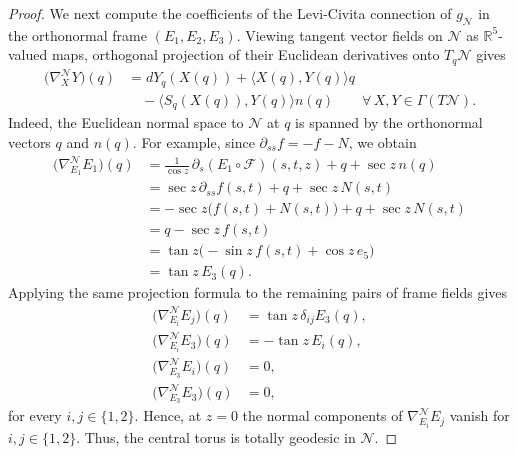 \documentclass[a4paper,11pt,oneside,reqno]{amsart}
\numberwithin{equation}{section}
\theoremstyle{definition}
\begin{document}
\begin{proof}
    We next compute the coefficients of the Levi-Civita connection of
    $g_{\mathcal{N}}$ in the orthonormal frame $(E_1,E_2,E_3)$.
    Viewing tangent vector fields on $\mathcal{N}$
    as $\mathbb{R}^5$-valued maps, orthogonal projection
    of their Euclidean derivatives onto $T_q\mathcal{N}$
    gives
    \begin{align*}
        \bigl(\nabla^{\mathcal{N}}_X Y\bigr)(q)
        &=dY_q(X(q))+\langle X(q),Y(q)\rangle q\\
        &\quad-\langle S_q(X(q)),Y(q)\rangle n(q)
        \qquad\forall\,X,Y\in\Gamma(T\mathcal{N}).
    \end{align*}
    Indeed, the Euclidean normal space to $\mathcal{N}$
    at $q$ is spanned by the orthonormal vectors
    $q$ and $n(q)$.
    For example, since
    $\partial_{ss}f=-f-N$, we obtain
    \begin{align*}
        \bigl(\nabla^{\mathcal{N}}_{E_1}E_1\bigr)(q)
        &=
        \frac{1}{\cos z}\,
        \partial_s(E_1\circ\mathcal{F})(s,t,z)
        +q+\sec z\,n(q)\\
        &=
        \sec z\,\partial_{ss}f(s,t)
        +q+\sec z\,N(s,t)\\
        &=
        -\sec z\bigl(f(s,t)+N(s,t)\bigr)
        +q+\sec z\,N(s,t)\\
        &=q-\sec z\,f(s,t)\\
        &=
        \tan z\bigl(-\sin z\,f(s,t)+\cos z\,e_5\bigr)\\
        &=\tan z\,E_3(q).
    \end{align*}
    Applying the same projection formula to the
    remaining pairs of frame fields gives
    \begin{align*}
        \bigl(\nabla^{\mathcal{N}}_{E_i}E_j\bigr)(q)
        &=\tan z\,\delta_{ij}E_3(q),\\
        \bigl(\nabla^{\mathcal{N}}_{E_i}E_3\bigr)(q)
        &=-\tan z\,E_i(q),\\
        \bigl(\nabla^{\mathcal{N}}_{E_3}E_i\bigr)(q)
        &=0,\\
        \bigl(\nabla^{\mathcal{N}}_{E_3}E_3\bigr)(q)
        &=0,
    \end{align*}
    for every $i,j\in\{1,2\}$. Hence, at $z=0$ the normal components of $\nabla^{\mathcal{N}}_{E_i}E_j$ vanish for $i,j\in\{1,2\}$. Thus, the central torus is totally geodesic in $\mathcal{N}$.


\end{proof}
\end{document}
